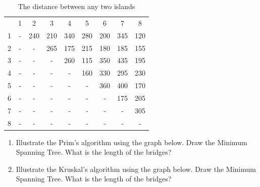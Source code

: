 \documentclass[english]{article}
\begin{document}
\begin{table}[H]
    \centering
    \begin{tabular}{ccccccccc}
          & 1 & 2   & 3   & 4   & 5   & 6   & 7   & 8   \tabularnewline
        1 & - & 240 & 210 & 340 & 280 & 200 & 345 & 120 \tabularnewline
        2 & - & -   & 265 & 175 & 215 & 180 & 185 & 155 \tabularnewline
        3 & - & -   & -   & 260 & 115 & 350 & 435 & 195 \tabularnewline
        4 & - & -   & -   & -   & 160 & 330 & 295 & 230 \tabularnewline
        5 & - & -   & -   & -   & -   & 360 & 400 & 170 \tabularnewline
        6 & - & -   & -   & -   & -   & -   & 175 & 205 \tabularnewline
        7 & - & -   & -   & -   & -   & -   & -   & 305 \tabularnewline
        8 & - & -   & -   & -   & -   & -   & -   & -   \tabularnewline
    \end{tabular}
    \caption{The distance between any two islands}
    \label{tab:my_label}
\end{table}


\begin{enumerate}
\item Illustrate the Prim's algorithm using the graph below. Draw the Minimum Spanning Tree. What is the length of the bridges?

\item Illustrate the Kruskal's algorithm using the graph below. Draw the Minimum Spanning Tree. What is the length of the bridges?

\end{enumerate}
\end{document}
